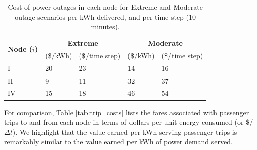 \documentclass[journal]{IEEEtran}
\begin{document}
\begin{table}[!htbp]
    \renewcommand{\arraystretch}{1}
    \caption{Cost of power outages in each node for Extreme and Moderate outage scenarios per kWh delivered, and per time step (10 minutes).}
    \label{tab:outage_costs}
    \centering
    \def\colmargin{6.75cm}
    \begin{tabular}{lllll}
    \hline
    \multirow{2}{*}{\textbf{Node ($i$)}} & \multicolumn{2}{c}{\textbf{Extreme}} & \multicolumn{2}{c}{\textbf{Moderate}} \\
     & (\$/kWh) & (\$/time step) & (\$/kWh) & (\$/time step) \\
    \hline
    I  & 20 & 23 & 14 & 16 \\
    II & 9  & 11 & 32 & 37 \\
    IV & 15 & 18 & 46 & 54 \\
    \hline
    \end{tabular}
\end{table}

For comparison, Table \ref{tab:trip_costs} lists the fares associated with passenger trips to and from each node in terms of dollars per unit energy consumed (or \$/$\Delta t$). We highlight that the value earned per kWh serving passenger trips is remarkably similar to the value earned per kWh of power demand served.
\end{document}
